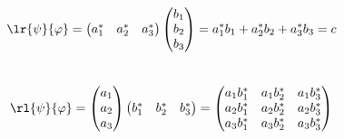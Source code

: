 \begin{frame}{}
        \解 ~ \[\lr{\psi}{\varphi} = \begin{pmatrix}
            a_1 ^* &
            a_2 ^* &
            a_3 ^*
        \end{pmatrix}
            \begin{pmatrix}
            b_1\\
            b_2\\
            b_3
        \end{pmatrix}
        =a_1 ^* b_1 +a_2 ^* b_2 +a_3 ^* b_3
        =c 
        \]
        ~ \[\rl{\psi}{\varphi} = \begin{pmatrix}
            a_1  \\
            a_2  \\
            a_3 
        \end{pmatrix}
            \begin{pmatrix}
            b_1 ^* &
            b_2 ^* &
            b_3 ^*
        \end{pmatrix}
        =  \begin{pmatrix}
            a_1b_1 ^* & a_1b_2 ^* & a_1b_3 ^* \\
            a_2b_1 ^* & a_2b_2 ^* & a_2b_3 ^* \\
            a_3b_1 ^* & a_3b_2 ^* & a_3b_3 ^* 
        \end{pmatrix}
        \]
\end{frame}

